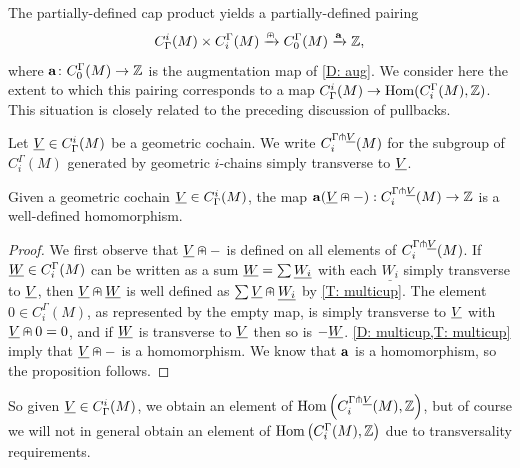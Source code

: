 The partially-defined cap product yields a partially-defined pairing
$$C^i_\Gamma(M) \times C_i^\Gamma(M) \xrightarrow{\nplus} C_0^\Gamma(M) \xrightarrow{\mathbf{a}}\mathbb{Z},$$
where $\mathbf{a} \colon C_0^\Gamma(M) \to \mathbb{Z}$ is the augmentation map of \cref{D: aug}.
We consider here the extent to which this pairing corresponds to a map $C^i_\Gamma(M) \to \textup{Hom}(C_i^\Gamma(M),\mathbb{Z})$.
This situation is closely related to the preceding discussion of pullbacks.

\begin{definition}\label{D: transverse to cohain}
	Let $\underline{V} \in C^i_\Gamma(M)$ be a geometric cochain.
	We write $C_i^{\Gamma \pitchfork \underline{V}}(M)$ for the subgroup of $C_i^\Gamma(M)$ generated by geometric $i$-chains simply transverse to $\underline{V}$.
\end{definition}

\begin{proposition}\label{P: chain kronecker}
	Given a geometric cochain $\underline{V} \in C^i_\Gamma(M)$, the map $\mathbf{a}(\underline{V}\nplus -):C_i^{\Gamma \pitchfork \underline{V}}(M) \to \mathbb{Z}$ is a well-defined homomorphism.
\end{proposition}

\begin{proof}
	We first observe that $\underline{V}\nplus -$ is defined on all elements of $C_i^{\Gamma \pitchfork \underline{V}}(M)$.
	If $\underline{W} \in C_i^\Gamma(M)$ can be written as a sum $\underline{W} = \sum \underline{W_i}$ with each $\underline{W_i}$ simply transverse to $\underline{V}$, then $\underline{V}\nplus \underline{W}$ is well defined as $\sum \underline{V}\nplus \underline{W_i}$ by \cref{T: multicup}.
	The element $0 \in C_i^\Gamma(M)$, as represented by the empty map, is simply transverse to $\underline{V}$ with $\underline{V}\nplus 0 = 0$, and if $\underline{W}$ is transverse to $\underline{V}$ then so is $-\underline{W}$.
	\cref{D: multicup,T: multicup} imply that $\underline{V} \nplus -$ is a homomorphism.
	We know that $\mathbf{a}$ is a homomorphism, so the proposition follows.
\end{proof}

So given $\underline{V} \in C^i_\Gamma(M)$, we obtain an element of $\textup{Hom}\left(C_i^{\Gamma \pitchfork \underline{V}}(M),\mathbb{Z}\right)$, but of course we will not in general obtain an element of $\textup{Hom}\left(C_i^{\Gamma}(M), \mathbb{Z} \right)$ due to transversality requirements.

